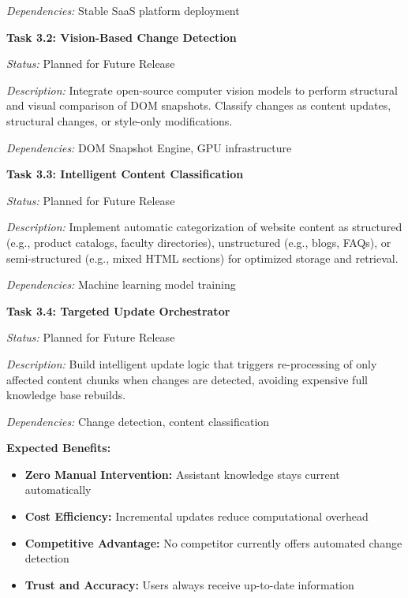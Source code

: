 \textit{Dependencies:} Stable SaaS platform deployment

\vspace{0.3cm}

\textbf{Task 3.2: Vision-Based Change Detection}

\textit{Status:} Planned for Future Release

\textit{Description:} Integrate open-source computer vision models to perform structural and visual comparison of DOM snapshots. Classify changes as content updates, structural changes, or style-only modifications.

\textit{Dependencies:} DOM Snapshot Engine, GPU infrastructure

\vspace{0.3cm}

\textbf{Task 3.3: Intelligent Content Classification}

\textit{Status:} Planned for Future Release

\textit{Description:} Implement automatic categorization of website content as structured (e.g., product catalogs, faculty directories), unstructured (e.g., blogs, FAQs), or semi-structured (e.g., mixed HTML sections) for optimized storage and retrieval.

\textit{Dependencies:} Machine learning model training

\vspace{0.3cm}

\textbf{Task 3.4: Targeted Update Orchestrator}

\textit{Status:} Planned for Future Release

\textit{Description:} Build intelligent update logic that triggers re-processing of only affected content chunks when changes are detected, avoiding expensive full knowledge base rebuilds.

\textit{Dependencies:} Change detection, content classification

\vspace{0.3cm}

\textbf{Expected Benefits:}
\begin{itemize}[leftmargin=*]
    \item \textbf{Zero Manual Intervention:} Assistant knowledge stays current automatically
    \item \textbf{Cost Efficiency:} Incremental updates reduce computational overhead
    \item \textbf{Competitive Advantage:} No competitor currently offers automated change detection
    \item \textbf{Trust and Accuracy:} Users always receive up-to-date information
\end{itemize}

